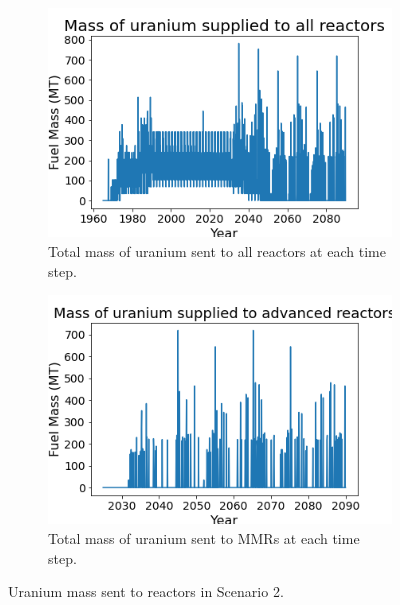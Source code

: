 \begin{figure}
    \centering
    \begin{subfigure}{0.4\textwidth}
        \centering
        \includegraphics[scale=0.3]{figures/fuelsupply_scenarios_2.png}
        \caption{Total mass of uranium sent to all reactors at each time step.}
        \label{fig:totalfuel_2}
    \end{subfigure}
    \begin{subfigure}{0.4\textwidth}
        \centering
        \includegraphics[scale=0.3]{figures/advancedRX_fuelsupply_scenarios_2.png}
        \caption{Total mass of uranium sent to \glspl{MMR} at each time step.}
        \label{fig:haleu_2}
    \end{subfigure}
    \caption{Uranium mass sent to reactors in Scenario 2.}
    \label{fig:fuel_2}
\end{figure}


